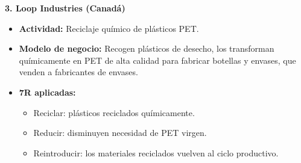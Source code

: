 \begin{solution}
\textbf{3. Loop Industries (Canadá)}
\begin{itemize}
    \item \textbf{Actividad:} Reciclaje químico de plásticos PET.
    \item \textbf{Modelo de negocio:} Recogen plásticos de desecho, los transforman químicamente en PET de alta calidad para fabricar botellas y envases, que venden a fabricantes de envases.
    \item \textbf{7R aplicadas:}
        \begin{itemize}
            \item Reciclar: plásticos reciclados químicamente.
            \item Reducir: disminuyen necesidad de PET virgen.
            \item Reintroducir: los materiales reciclados vuelven al ciclo productivo.
        \end{itemize}
\end{itemize}
\end{solution}
